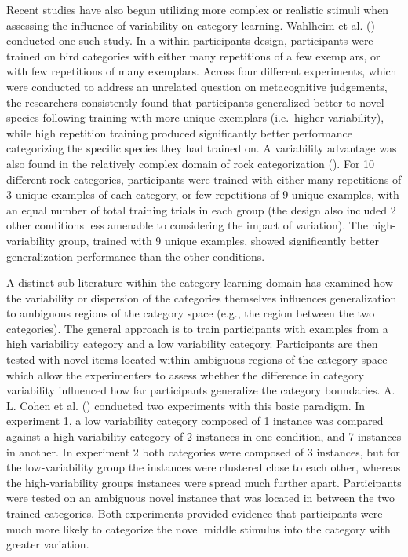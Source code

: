 \documentclass[
  11pt,
  letterpaper,
]{article}
\begin{document}
Recent studies have also begun utilizing more complex or realistic
stimuli when assessing the influence of variability on category
learning. Wahlheim et al.
()
conducted one such study. In a within-participants design, participants
were trained on bird categories with either many repetitions of a few
exemplars, or with few repetitions of many exemplars. Across four
different experiments, which were conducted to address an unrelated
question on metacognitive judgements, the researchers consistently found
that participants generalized better to novel species following training
with more unique exemplars (i.e.~higher variability), while high
repetition training produced significantly better performance
categorizing the specific species they had trained on. A variability
advantage was also found in the relatively complex domain of rock
categorization
(). For 10 different rock categories, participants were trained with
either many repetitions of 3 unique examples of each category, or few
repetitions of 9 unique examples, with an equal number of total training
trials in each group (the design also included 2 other conditions less
amenable to considering the impact of variation). The high-variability
group, trained with 9 unique examples, showed significantly better
generalization performance than the other conditions.

A distinct sub-literature within the category learning domain has
examined how the variability or dispersion of the categories themselves
influences generalization to ambiguous regions of the category space
(e.g., the region between the two categories). The general approach is
to train participants with examples from a high variability category and
a low variability category. Participants are then tested with novel
items located within ambiguous regions of the category space which allow
the experimenters to assess whether the difference in category
variability influenced how far participants generalize the category
boundaries. A. L. Cohen et al.
() conducted
two experiments with this basic paradigm. In experiment 1, a low
variability category composed of 1 instance was compared against a
high-variability category of 2 instances in one condition, and 7
instances in another. In experiment 2 both categories were composed of 3
instances, but for the low-variability group the instances were
clustered close to each other, whereas the high-variability groups
instances were spread much further apart. Participants were tested on an
ambiguous novel instance that was located in between the two trained
categories. Both experiments provided evidence that participants were
much more likely to categorize the novel middle stimulus into the
category with greater variation.
\end{document}
